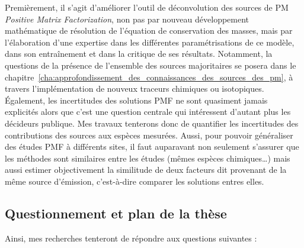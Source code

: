 Premièrement, il s'agit d'améliorer l'outil de déconvolution des sources de PM
\textit{Positive Matrix Factorization}, non pas par nouveau développement mathématique de
résolution de l'équation de conservation des masses, mais par l'élaboration d'une
expertise dans les différentes paramétrisations de ce modèle, dans son entraînement et
dans la critique de ses résultats. Notamment, la questions de la présence de l'ensemble
des sources majoritaires se posera dans le
chapitre~\ref{cha:approfondissement_des_connaissances_des_sources_des_pm}, à travers
l'implémentation de nouveux traceurs chimiques ou isotopiques.
Également, les incertitudes des solutions PMF ne sont quasiment jamais explicités alors
que c'est une question centrale qui intéressent d'autant plus les décideurs publique. Mes
travaux tenterons donc de quantifier les incertitudes des contributions des sources aux
espèces mesurées.
Aussi, pour pouvoir généraliser des études PMF à différents sites, il faut auparavant
non seulement s'assurer que les méthodes sont similaires entre les études (mêmes espèces
chimiques…) mais aussi estimer objectivement la similitude de deux facteurs dit provenant
de la même source d'émission, c'est-à-dire comparer les solutions entres elles.


\subsection{Questionnement et plan de la thèse}%
\label{sub:plan_de_la_thèse}

Ainsi, mes recherches tenteront de répondre aux questions suivantes :

